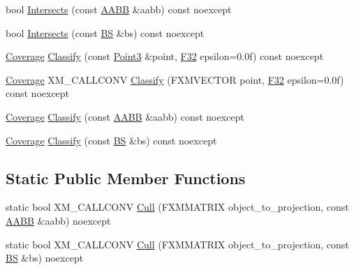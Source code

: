 \begin{DoxyCompactItemize}
\item 
bool \hyperlink{structmage_1_1_view_frustum_a222e185f69a78f3c363423618f0a506d}{Intersects} (const \hyperlink{structmage_1_1_a_a_b_b}{A\+A\+BB} \&aabb) const noexcept
\item 
bool \hyperlink{structmage_1_1_view_frustum_a2925f619827d284c86ea5a68e694a8a8}{Intersects} (const \hyperlink{structmage_1_1_b_s}{BS} \&bs) const noexcept
\item 
\hyperlink{namespacemage_aa9fe157e5a578a103160266df8cccb0a}{Coverage} \hyperlink{structmage_1_1_view_frustum_ad93689c175655b62ccbc91304a59cb0b}{Classify} (const \hyperlink{structmage_1_1_point3}{Point3} \&point, \hyperlink{namespacemage_aa97e833b45f06d60a0a9c4fc22ae02c0}{F32} epsilon=0.\+0f) const noexcept
\item 
\hyperlink{namespacemage_aa9fe157e5a578a103160266df8cccb0a}{Coverage} X\+M\+\_\+\+C\+A\+L\+L\+C\+O\+NV \hyperlink{structmage_1_1_view_frustum_a854ae9018bd0caff9f0d0242fbfa8101}{Classify} (F\+X\+M\+V\+E\+C\+T\+OR point, \hyperlink{namespacemage_aa97e833b45f06d60a0a9c4fc22ae02c0}{F32} epsilon=0.\+0f) const noexcept
\item 
\hyperlink{namespacemage_aa9fe157e5a578a103160266df8cccb0a}{Coverage} \hyperlink{structmage_1_1_view_frustum_a2c8ac9e080897aa02902d383e64a50e7}{Classify} (const \hyperlink{structmage_1_1_a_a_b_b}{A\+A\+BB} \&aabb) const noexcept
\item 
\hyperlink{namespacemage_aa9fe157e5a578a103160266df8cccb0a}{Coverage} \hyperlink{structmage_1_1_view_frustum_ad614c4948b6a99174d9aeac5dd5825f5}{Classify} (const \hyperlink{structmage_1_1_b_s}{BS} \&bs) const noexcept
\end{DoxyCompactItemize}
\subsection*{Static Public Member Functions}
\begin{DoxyCompactItemize}
\item 
static bool X\+M\+\_\+\+C\+A\+L\+L\+C\+O\+NV \hyperlink{structmage_1_1_view_frustum_ad15a8f101e90d6e539ce050510996f16}{Cull} (F\+X\+M\+M\+A\+T\+R\+IX object\+\_\+to\+\_\+projection, const \hyperlink{structmage_1_1_a_a_b_b}{A\+A\+BB} \&aabb) noexcept
\item 
static bool X\+M\+\_\+\+C\+A\+L\+L\+C\+O\+NV \hyperlink{structmage_1_1_view_frustum_ac76bd70f227e0f5932fb9e7fc53e0012}{Cull} (F\+X\+M\+M\+A\+T\+R\+IX object\+\_\+to\+\_\+projection, const \hyperlink{structmage_1_1_b_s}{BS} \&bs) noexcept
\end{DoxyCompactItemize}
